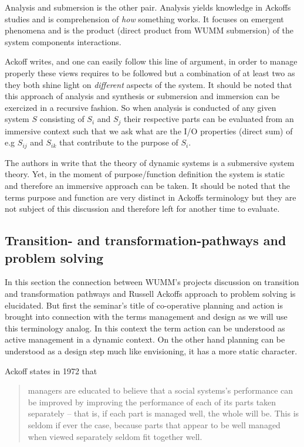 \documentclass[a4paper,11pt]{article}
\begin{document}
Analysis and submersion is the other pair. Analysis yields knowledge in
Ackoffs studies and is comprehension of \textit{how} something works. It
focuses on emergent phenomena and is the product (direct product from WUMM
submersion) of the system components interactions.

Ackoff writes, and one can easily follow this line of argument, in order to
manage properly these views requires to be followed but a combination of at
least two as they both shine light on \emph{different} aspects of the system.
It should be noted that this approach of analysis and synthesis or submersion
and immersion can be exercized in a recursive fashion. So when analysis is
conducted of any given system $S$ consisting of $S_i$ and $S_j$ their
respective parts can be evaluated from an immersive context such that we ask
what are the I/O properties (direct sum) of e.g $S_{ij}$ and $S_{ik}$ that
contribute to the purpose of $S_i$.

The authors in \cite[p.~21]{grabe2020seminar} write that the theory of dynamic
systems is a submersive system theory. Yet, in the moment of purpose/function
definition the system is static and therefore an immersive approach can be
taken. It should be noted that the terms purpose and function are very
distinct in Ackoffs terminology but they are not subject of this discussion
and therefore left for another time to evaluate.

\subsection{Transition- and transformation-pathways and problem solving} 

In this section the connection between WUMM's projects discussion on
transition and transformation pathways and Russell Ackoffs approach to problem
solving is elucidated. But first the seminar's title of co-operative planning
and action is brought into connection with the terms management and design as
we will use this terminology analog. In this context the term action can be
understood as active management in a dynamic context. On the other hand
planning can be understood as a design step much like envisioning, it has a
more static character.

Ackoff states in 1972 \cite{ackoff1994systems} that
\begin{quote}
  managers are educated to believe that a social systems's performance can be
  improved by improving the performance of each of its parts taken separately
  -- that is, if each part is managed well, the whole will be. This is seldom
  if ever the case, because parts that appear to be well managed when viewed
  separately seldom fit together well.
\end{quote} 
\end{document}
